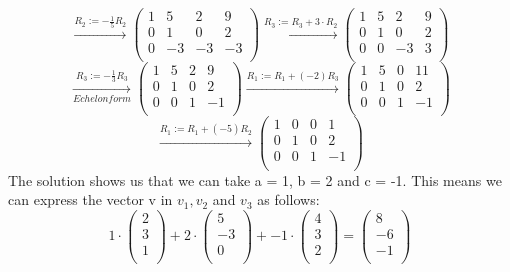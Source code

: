 \documentclass[a4paper]{article}
\begin{document}
\[
\xrightarrow{\text{$R_2 := - \frac{1}{5} R_2$}}
\left(
\begin{array}{ccc|c}
1 & 5 & 2 & 9 \\
0 & 1 & 0 & 2 \\
0 & -3 & -3 & -3 \\
\end{array}
\right)
\xrightarrow{\text{$R_3 := R_3 + 3 \cdot R_2$}}
\left(
\begin{array}{ccc|c}
1 & 5 & 2 & 9 \\
0 & 1 & 0 & 2 \\
0 & 0 & -3 & 3 \\
\end{array}
\right)
\]
\[
\xrightarrow[Echelon form]{\text{$R_3 := - \frac{1}{3} R_3$}}
\left(
\begin{array}{ccc|c}
1 & 5 & 2 & 9 \\
0 & 1 & 0 & 2 \\
0 & 0 & 1 & -1 \\
\end{array}
\right)
\xrightarrow{\text{$R_1 := R_1 + (-2) R_3$}}
\left(
\begin{array}{ccc|c}
1 & 5 & 0 & 11 \\
0 & 1 & 0 & 2 \\
0 & 0 & 1 & -1 \\
\end{array}
\right)
\]
\[
\xrightarrow{\text{$R_1 := R_1 + (-5) R_2$}}
\left(
\begin{array}{ccc|c}
1 & 0 & 0 & 1 \\
0 & 1 & 0 & 2 \\
0 & 0 & 1 & -1 \\
\end{array}
\right)
\]
The solution shows us that we can take a = 1, b = 2 and c = -1. This means we can express the vector v in $v_1, v_2$ and $v_3$ as follows:
\[
1 \cdot
\left(
\begin{array}{c}
2 \\
3 \\
1 \\
\end{array}
\right)
+ 2 \cdot
\left(
\begin{array}{c}
5 \\
-3 \\
0 \\
\end{array}
\right)
+ -1 \cdot
\left(
\begin{array}{c}
4 \\
3 \\
2 \\
\end{array}
\right)
=
\left(
\begin{array}{c}
8 \\
-6 \\
- 1 \\
\end{array}
\right)
\]
\end{document}
